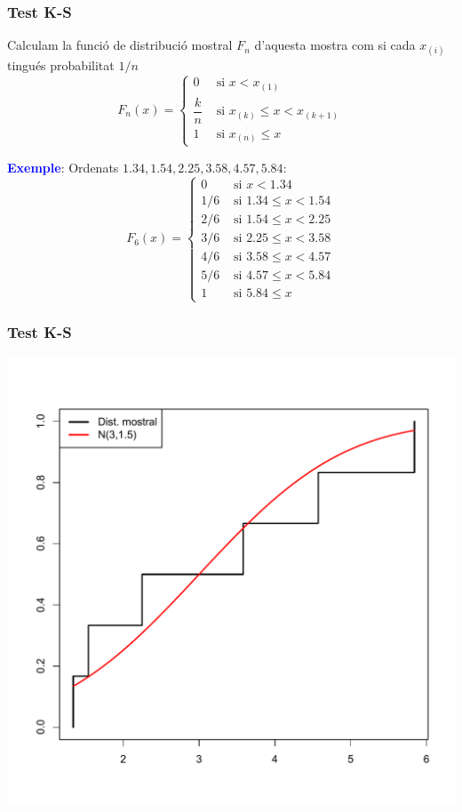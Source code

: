 \documentclass[12pt,t]{beamer}
\newcommand{\blue}[1]{\textcolor{blue}{#1}}
\renewcommand{\emph}[1]{{\color{red}#1}}
\renewcommand{\leq}{\leqslant}
\theoremstyle{plain}
\theoremstyle{definition}
\begin{document}
\begin{frame}
\frametitle{Test K-S}

Calculam la \emph{funció de distribució mostral} $F_{n}$
d'aquesta mostra com si cada $x_{(i)}$ tingués probabilitat $1/n$
$$
F_n(x)=\left\{\begin{array}{ll}
0 &\mbox{ si } x< x_{(1)} \\
\dfrac{k}{n}&\mbox{ si } x_{(k)}\leq x < x_{(k+1)}\\[2ex]
1 & \mbox{ si } x_{(n)} \leq x
\end{array}
\right.
$$


\blue{\bf Exemple}: Ordenats $1.34, 1.54, 2.25, 3.58, 4.57, 5.84$:
$$
F_6(x)=\left\{\begin{array}{ll}
0 &\mbox{ si } x< 1.34 \\
1/6 &\mbox{ si } 1.34\leq x <1.54\\
2/6 &\mbox{ si } 1.54\leq x <2.25\\
3/6 &\mbox{ si } 2.25\leq x <3.58\\
4/6 &\mbox{ si } 3.58\leq x <4.57\\
5/6 &\mbox{ si } 4.57\leq x <5.84\\
1 &\mbox{ si } 5.84\leq x 
\end{array}
\right.
$$

\end{frame}






\begin{frame}[fragile]
\frametitle{Test K-S}

\begin{center}
\includegraphics[width=0.9\linewidth]{KS2}
\end{center}


\end{frame}
\end{document}
